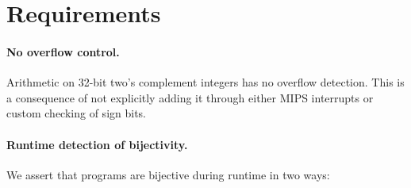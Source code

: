 \section{Requirements}

\paragraph{No overflow control.} Arithmetic on 32-bit two's complement integers
has no overflow detection. This is a consequence of not explicitly adding it
through either MIPS interrupts or custom checking of sign bits.

\paragraph{Runtime detection of bijectivity.} We assert that programs are
bijective during runtime in two ways:

